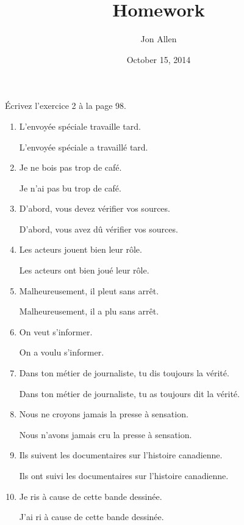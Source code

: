 \documentclass[letterpaper]{article}
\begin{document}
\title{Homework}
\date{October 15, 2014}
\author{Jon Allen}
\maketitle
Écrivez l'exercice 2 à la page 98.
\begin{enumerate}
\item
  L'envoyée spéciale travaille tard. 

  L'envoyée spéciale a travaillé tard.
\item
  Je ne bois pas trop de café.

  Je n'ai pas bu trop de café.
\item
  D'abord, vous devez vérifier vos sources.

  D'abord, vous avez dû vérifier vos sources.
\item
  Les acteurs jouent bien leur rôle.

  Les acteurs ont bien joué leur rôle.
\item
  Malheureusement, il pleut sans arrêt.

  Malheureusement, il a plu sans arrêt.
\item
  On veut s'informer.

  On a voulu s'informer.
\item
  Dans ton métier de journaliste, tu dis toujours la vérité.

  Dans ton métier de journaliste, tu as toujours dit la vérité.
\item
  Nous ne croyons jamais la presse à sensation.

  Nous n'avons jamais cru la presse à sensation.
\item
  Ils suivent les documentaires sur l'histoire canadienne.

  Ils ont suivi les documentaires sur l'histoire canadienne.
\item
  Je ris à cause de cette bande dessinée.

  J'ai ri à cause de cette bande dessinée.
\end{enumerate}
\end{document}
